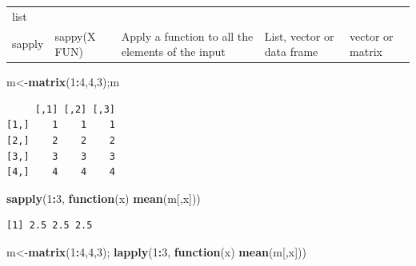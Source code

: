 \documentclass[]{book}
\newenvironment{Shaded}{\begin{snugshade}}{\end{snugshade}}
\newcommand{\ControlFlowTok}[1]{\textcolor[rgb]{0.13,0.29,0.53}{\textbf{#1}}}
\newcommand{\DecValTok}[1]{\textcolor[rgb]{0.00,0.00,0.81}{#1}}
\newcommand{\KeywordTok}[1]{\textcolor[rgb]{0.13,0.29,0.53}{\textbf{#1}}}
\newcommand{\NormalTok}[1]{#1}
\newcommand{\OperatorTok}[1]{\textcolor[rgb]{0.81,0.36,0.00}{\textbf{#1}}}
\theoremstyle{definition}
\theoremstyle{definition}
\theoremstyle{definition}
\theoremstyle{remark}
\begin{document}
\begin{longtable}[]{@{}lllll@{}}
\begin{minipage}[t]{0.17\columnwidth}
list\strut
\end{minipage}\tabularnewline
\begin{minipage}[t]{0.17\columnwidth}\raggedright
sapply\strut
\end{minipage} & \begin{minipage}[t]{0.17\columnwidth}\raggedright
sappy(X FUN)\strut
\end{minipage} & \begin{minipage}[t]{0.17\columnwidth}\raggedright
Apply a function to all the elements of the input\strut
\end{minipage} & \begin{minipage}[t]{0.17\columnwidth}\raggedright
List, vector or data frame\strut
\end{minipage} & \begin{minipage}[t]{0.17\columnwidth}\raggedright
vector or matrix\strut
\end{minipage}\tabularnewline
\bottomrule
\end{longtable}

\begin{Shaded}
\begin{Highlighting}[]
\NormalTok{m<-}\KeywordTok{matrix}\NormalTok{(}\DecValTok{1}\OperatorTok{:}\DecValTok{4}\NormalTok{,}\DecValTok{4}\NormalTok{,}\DecValTok{3}\NormalTok{);m}
\end{Highlighting}
\end{Shaded}

\begin{verbatim}
     [,1] [,2] [,3]
[1,]    1    1    1
[2,]    2    2    2
[3,]    3    3    3
[4,]    4    4    4
\end{verbatim}

\begin{Shaded}
\begin{Highlighting}[]
\KeywordTok{sapply}\NormalTok{(}\DecValTok{1}\OperatorTok{:}\DecValTok{3}\NormalTok{, }\ControlFlowTok{function}\NormalTok{(x) }\KeywordTok{mean}\NormalTok{(m[,x]))}
\end{Highlighting}
\end{Shaded}

\begin{verbatim}
[1] 2.5 2.5 2.5
\end{verbatim}

\begin{Shaded}
\begin{Highlighting}[]
\NormalTok{m<-}\KeywordTok{matrix}\NormalTok{(}\DecValTok{1}\OperatorTok{:}\DecValTok{4}\NormalTok{,}\DecValTok{4}\NormalTok{,}\DecValTok{3}\NormalTok{);}
\KeywordTok{lapply}\NormalTok{(}\DecValTok{1}\OperatorTok{:}\DecValTok{3}\NormalTok{, }\ControlFlowTok{function}\NormalTok{(x) }\KeywordTok{mean}\NormalTok{(m[,x]))}
\end{Highlighting}
\end{Shaded}
\end{document}
